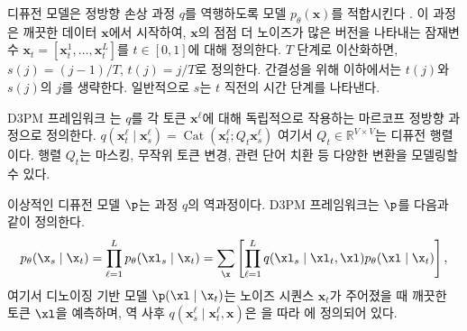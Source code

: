 \documentclass{article} %
\begin{document}

디퓨전 모델은 정방향 손상 과정 $q$를 역행하도록 모델 $p_\theta(\mathbf{x})$를 적합시킨다 \citep{sohl2015deep,ho2020denoising,sahoo2024diffusion}. 이 과정은 깨끗한 데이터 $\mathbf{x}$에서 시작하여, $\mathbf{x}$의 점점 더 노이즈가 많은 버전을 나타내는 잠재변수 $\mathbf{x}_t = \left[\mathbf{x}^1_t, \dots, \mathbf{x}^L_t\right]$를 $t \in [0, 1]$에 대해 정의한다. $T$ 단계로 이산화하면, $s(j) = (j -1)/T$, $t(j) = j /T$로 정의한다. 간결성을 위해 이하에서는 $t(j)$와 $s(j)$의 $j$를 생략한다. 일반적으로 $s$는 $t$ 직전의 시간 단계를 나타낸다.

D3PM 프레임워크 \citep{austin2021structured}는 $q$를 각 토큰 $\mathbf{x}^\ell$에 대해 독립적으로 작용하는 마르코프 정방향 과정으로 정의한다.
$q(\mathbf{x}^\ell_{t} \mid \mathbf{x}^\ell_{s}) = \operatorname{Cat}(\mathbf{x}^\ell_t ; Q_t \mathbf{x}^\ell_{s})$
여기서 $Q_t \in \mathbb{R}^{V \times V}$는 디퓨전 행렬이다. 행렬 $Q_t$는 마스킹, 무작위 토큰 변경, 관련 단어 치환 등 다양한 변환을 모델링할 수 있다.

이상적인 디퓨전 모델 $\p$는 과정 $q$의 역과정이다. D3PM 프레임워크는 $\p$를 다음과 같이 정의한다.
\begin{align}\label{eqn:diffusion}
    p_\theta(\x_s \mid \x_t) = \prod_{\ell=1}^L p_\theta(\xl_s \mid \x_t) = \sum_{\x} \left[\prod_{\ell=1}^L q(\xl_s \mid \xl_t, \xl) p_\theta(\xl \mid \x_t)\right],
\end{align}
여기서 디노이징 기반 모델 $\p(\xl \mid \x_t)$는 노이즈 시퀀스 $\mathbf{x}_t$가 주어졌을 때 깨끗한 토큰 $\xl$을 예측하며, 역 사후 $q(\mathbf{x}^\ell_s \mid \mathbf{x}^\ell_t, \mathbf{x})$은 \citet{austin2021structured}을 따라 에 정의되어 있다.
\end{document}
